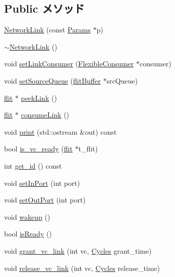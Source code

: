 \subsection*{Public メソッド}
\begin{DoxyCompactItemize}
\item 
\hyperlink{classNetworkLink_a09a2f79e20e84a934b9cfb26de2a195c}{NetworkLink} (const \hyperlink{classNetworkLink_a1da148687c9777c23a833785c588c749}{Params} $\ast$p)
\item 
\hyperlink{classNetworkLink_a68b002a2a7e75981425457f027cb4474}{$\sim$NetworkLink} ()
\item 
void \hyperlink{classNetworkLink_ad25cd0a8bd8cc04be12bdcfee67aa808}{setLinkConsumer} (\hyperlink{classFlexibleConsumer}{FlexibleConsumer} $\ast$consumer)
\item 
void \hyperlink{classNetworkLink_a6897db68790663c5701e8d845e50c570}{setSourceQueue} (\hyperlink{classflitBuffer}{flitBuffer} $\ast$srcQueue)
\item 
\hyperlink{classflit}{flit} $\ast$ \hyperlink{classNetworkLink_a799dc9601866e00ee9214f8e48afef3e}{peekLink} ()
\item 
\hyperlink{classflit}{flit} $\ast$ \hyperlink{classNetworkLink_a01ad504bd5f2e56abcff256bc4db0c22}{consumeLink} ()
\item 
void \hyperlink{classNetworkLink_ac55fe386a101fbae38c716067c9966a0}{print} (std::ostream \&out) const 
\item 
bool \hyperlink{classNetworkLink_ac7f0b8d2495de3315119a243c4b3b6fd}{is\_\-vc\_\-ready} (\hyperlink{classflit}{flit} $\ast$t\_\-flit)
\item 
int \hyperlink{classNetworkLink_acbd793db2c457c9c720b8c9084cf3be9}{get\_\-id} () const 
\item 
void \hyperlink{classNetworkLink_a1ec0cbfcb39559c3f6262ad360d910b4}{setInPort} (int port)
\item 
void \hyperlink{classNetworkLink_a6e1fcbbdee4eeca176ab6b03b6c19ee9}{setOutPort} (int port)
\item 
void \hyperlink{classNetworkLink_ae674290a26ecbd622c5160e38e8a4fe9}{wakeup} ()
\item 
bool \hyperlink{classNetworkLink_acbed040576a7a18e2d9c46b2f15e0162}{isReady} ()
\item 
void \hyperlink{classNetworkLink_a6617d5216f3d137e1075916883455a9c}{grant\_\-vc\_\-link} (int vc, \hyperlink{classCycles}{Cycles} grant\_\-time)
\item 
void \hyperlink{classNetworkLink_a63228acf1c1f11d1b99a4acfacfb21d4}{release\_\-vc\_\-link} (int vc, \hyperlink{classCycles}{Cycles} release\_\-time)

\end{DoxyCompactItemize}
